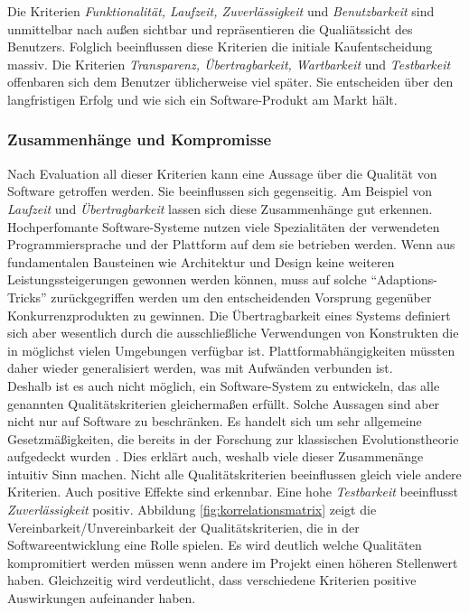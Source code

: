 Die Kriterien \textit{Funktionalität, Laufzeit, Zuverlässigkeit} und \textit{Benutzbarkeit} sind unmittelbar nach außen sichtbar und repräsentieren die Qualiätssicht des Benutzers. Folglich beeinflussen diese Kriterien die initiale Kaufentscheidung massiv. Die Kriterien \textit{Transparenz, Übertragbarkeit, Wartbarkeit} und \textit{Testbarkeit} offenbaren sich dem Benutzer üblicherweise viel später. Sie entscheiden über den langfristigen Erfolg und wie sich ein Software-Produkt am Markt hält.

\subsubsection{Zusammenhänge und Kompromisse} 
Nach Evaluation all dieser Kriterien kann eine Aussage über die Qualität von Software getroffen werden. Sie beeinflussen sich gegenseitig. Am Beispiel von \textit{Laufzeit} und \textit{Übertragbarkeit} lassen sich diese Zusammenhänge gut erkennen. Hochperfomante Software-Systeme nutzen viele Spezialitäten  der verwendeten Programmiersprache und der Plattform auf dem sie betrieben werden. Wenn aus fundamentalen Bausteinen wie Architektur und Design keine weiteren Leistungssteigerungen gewonnen werden können, muss auf solche ``Adaptions-Tricks'' zurückgegriffen werden um den entscheidenden Vorsprung gegenüber Konkurrenzprodukten zu gewinnen. Die Übertragbarkeit eines Systems definiert sich aber wesentlich durch die ausschließliche Verwendungen von Konstrukten die in möglichst vielen Umgebungen verfügbar ist. Plattformabhängigkeiten müssten daher wieder generalisiert werden, was mit Aufwänden verbunden ist.\\
Deshalb ist es auch nicht möglich, ein Software-System zu entwickeln, das alle genannten Qualitätskriterien gleichermaßen erfüllt. Solche Aussagen sind aber nicht nur auf Software zu beschränken. Es handelt sich um sehr allgemeine Gesetzmäßigkeiten, die bereits in der Forschung zur klassischen Evolutionstheorie aufgedeckt wurden \cite{hoffmann_software-qualitat_2013}. Dies erklärt auch, weshalb viele dieser Zusammenänge intuitiv Sinn machen. Nicht alle Qualitätskriterien beeinflussen gleich viele andere Kriterien. Auch positive Effekte sind erkennbar. Eine hohe \textit{Testbarkeit} beeinflusst \textit{Zuverlässigkeit} positiv. Abbildung \ref{fig:korrelationsmatrix} zeigt die Vereinbarkeit/Unvereinbarkeit der Qualitätskriterien, die in der Softwareentwicklung eine Rolle spielen. Es wird deutlich welche Qualitäten kompromitiert werden müssen wenn andere im Projekt einen höheren Stellenwert haben. Gleichzeitig wird verdeutlicht, dass verschiedene Kriterien positive Auswirkungen aufeinander haben.

